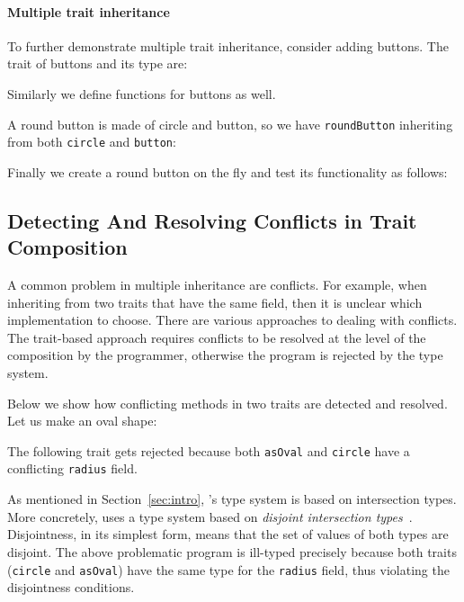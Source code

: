 \paragraph{Multiple trait inheritance} To further demonstrate multiple
trait inheritance, consider adding buttons. The trait of buttons and its type are:

Similarly we define functions for buttons as well.

\noindent A round button is made of circle and button, so we have
\lstinline{roundButton} inheriting from both \lstinline{circle} and
\lstinline{button}:

\noindent Finally we create a round button on the fly and test its functionality
as follows:

\subsection{Detecting And Resolving Conflicts in Trait Composition}
\label{sec:conflicts}

A common problem in multiple inheritance are conflicts. For example, when
inheriting from two traits that have the same field, then it is unclear which
implementation to choose. There are various approaches to dealing with conflicts.
The trait-based approach requires conflicts to be resolved at the level of the
composition by the programmer, otherwise the program is rejected by the type
system.

Below we show how conflicting methods in two traits are detected
and resolved. Let us make an oval shape:

The following trait gets rejected because both \lstinline{asOval} and
\lstinline{circle} have a conflicting \lstinline{radius} field.

\noindent As mentioned in Section~\ref{sec:intro}, \name's type system is based
on intersection types. More concretely, \name uses a type system based on
\emph{disjoint intersection types}~\cite{oliveira2016disjoint}. Disjointness, in
its simplest form, means that the set of values of both types are disjoint. The
above problematic program is ill-typed precisely because both
traits (\lstinline{circle} and \lstinline{asOval}) have the same type for the
\lstinline{radius} field, thus violating the disjointness conditions.

